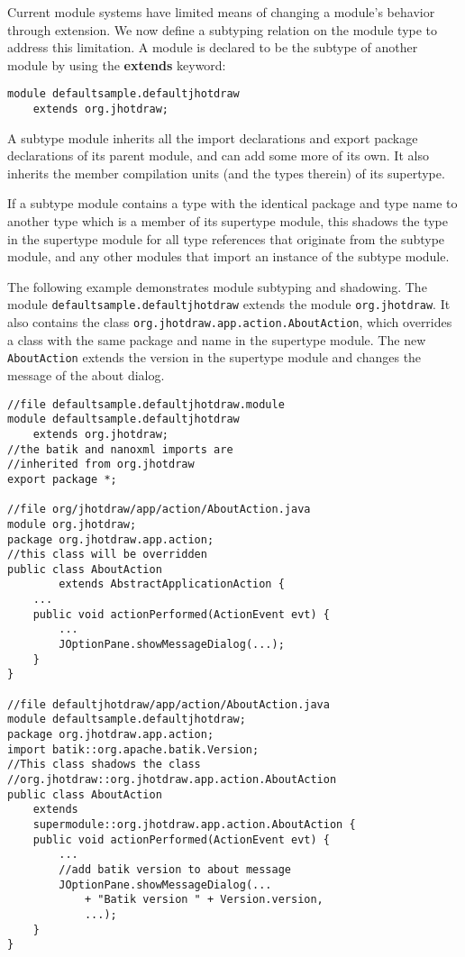 Current module systems have limited means of changing a module's behavior through
extension. We now define a subtyping relation on the module type to address this limitation. 
A module is declared to be the subtype of another module by using the \textbf{extends} keyword:

\begin{lstlisting}
module defaultsample.defaultjhotdraw 
	extends org.jhotdraw;
\end{lstlisting}

A subtype module inherits all the import declarations and export package declarations 
of its parent module, and can add some more of its own. It also inherits the member 
compilation units (and the types therein) of its supertype.

If a subtype module contains a type with the identical package and type name
to another type which is a member of its supertype module, 
this shadows the type in the supertype module for all type references that
originate from the subtype module, and any other modules that import an
instance of the subtype module.

The following example demonstrates module subtyping and shadowing. The module
\texttt{defaultsample.defaultjhotdraw} extends the module \texttt{org.jhotdraw}. 
It also contains the class \texttt{org.jhotdraw.app.action.AboutAction},
which overrides a class with the same package and name in the supertype module.
The new \texttt{AboutAction} extends the version in the supertype module and
changes the message of the about dialog.

\begin{lstlisting}[caption=Module Subtyping]
//file defaultsample.defaultjhotdraw.module 
module defaultsample.defaultjhotdraw 
	extends org.jhotdraw;
//the batik and nanoxml imports are 
//inherited from org.jhotdraw
export package *;

//file org/jhotdraw/app/action/AboutAction.java
module org.jhotdraw;
package org.jhotdraw.app.action;
//this class will be overridden
public class AboutAction 
		extends AbstractApplicationAction {
	...
	public void actionPerformed(ActionEvent evt) {
		...
		JOptionPane.showMessageDialog(...);
	}
}

//file defaultjhotdraw/app/action/AboutAction.java
module defaultsample.defaultjhotdraw;
package org.jhotdraw.app.action;
import batik::org.apache.batik.Version;
//This class shadows the class
//org.jhotdraw::org.jhotdraw.app.action.AboutAction
public class AboutAction 
	extends 
	supermodule::org.jhotdraw.app.action.AboutAction {
	public void actionPerformed(ActionEvent evt) {
		...
		//add batik version to about message
		JOptionPane.showMessageDialog(...
			+ "Batik version " + Version.version,
			...);
	}
}

\end{lstlisting}

